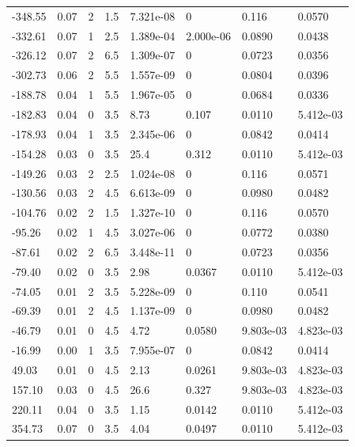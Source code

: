 \documentclass[preview]{standalone}
\begin{document}
{{\begin{tabular}{L{1.2cm}C{1.2cm} C{0.3cm}C{0.5cm} C{1.4cm}C{1.4cm} C{1.4cm}C{1.4cm}}
  -348.55  &  0.07  & 2     & 1.5 &  7.321e-08  & 0  & 0.116 &  0.0570   \\ 
  -332.61  &  0.07  & 1     & 2.5 &  1.389e-04  & 2.000e-06  & 0.0890 &  0.0438   \\ 
  -326.12  &  0.07  & 2     & 6.5 &  1.309e-07  & 0  & 0.0723 &  0.0356   \\ 
  -302.73  &  0.06  & 2     & 5.5 &  1.557e-09  & 0  & 0.0804 &  0.0396   \\ 
  -188.78  &  0.04  & 1     & 5.5 &  1.967e-05  & 0  & 0.0684 &  0.0336   \\ 
  -182.83  &  0.04  & 0     & 3.5 &  8.73  & 0.107  & 0.0110 &  5.412e-03   \\ 
  -178.93  &  0.04  & 1     & 3.5 &  2.345e-06  & 0  & 0.0842 &  0.0414   \\ 
  -154.28  &  0.03  & 0     & 3.5 &  25.4  & 0.312  & 0.0110 &  5.412e-03   \\ 
  -149.26  &  0.03  & 2     & 2.5 &  1.024e-08  & 0  & 0.116 &  0.0571   \\ 
  -130.56  &  0.03  & 2     & 4.5 &  6.613e-09  & 0  & 0.0980 &  0.0482   \\ 
  -104.76  &  0.02  & 2     & 1.5 &  1.327e-10  & 0  & 0.116 &  0.0570   \\ 
  -95.26  &  0.02  & 1     & 4.5 &  3.027e-06  & 0  & 0.0772 &  0.0380   \\ 
  -87.61  &  0.02  & 2     & 6.5 &  3.448e-11  & 0  & 0.0723 &  0.0356   \\ 
  -79.40  &  0.02  & 0     & 3.5 &  2.98  & 0.0367  & 0.0110 &  5.412e-03   \\ 
  -74.05  &  0.01  & 2     & 3.5 &  5.228e-09  & 0  & 0.110 &  0.0541   \\ 
  -69.39  &  0.01  & 2     & 4.5 &  1.137e-09  & 0  & 0.0980 &  0.0482   \\ 
  -46.79  &  0.01  & 0     & 4.5 &  4.72  & 0.0580  & 9.803e-03 &  4.823e-03   \\ 
  -16.99  &  0.00  & 1     & 3.5 &  7.955e-07  & 0  & 0.0842 &  0.0414   \\ 
  49.03  &  0.01  & 0     & 4.5 &  2.13  & 0.0261  & 9.803e-03 &  4.823e-03   \\ 
  157.10  &  0.03  & 0     & 4.5 &  26.6  & 0.327  & 9.803e-03 &  4.823e-03   \\ 
  220.11  &  0.04  & 0     & 3.5 &  1.15  & 0.0142  & 0.0110 &  5.412e-03   \\ 
  354.73  &  0.07  & 0     & 3.5 &  4.04  & 0.0497  & 0.0110 &  5.412e-03   \\ 

\end{tabular}}}
\end{document}
